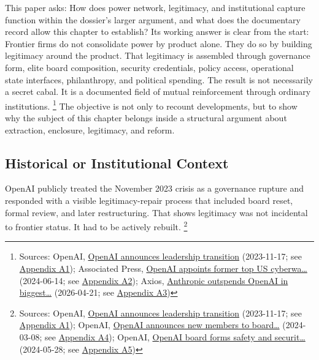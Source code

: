 \documentclass[
  american,
  11pt,
  letterpaper,
]{article}
\begin{document}
This paper asks: How does power network, legitimacy, and institutional
capture function within the dossier's larger argument, and what does the
documentary record allow this chapter to establish? Its working answer
is clear from the start: Frontier firms do not consolidate power by
product alone. They do so by building legitimacy around the product.
That legitimacy is assembled through governance form, elite board
composition, security credentials, policy access, operational state
interfaces, philanthropy, and political spending. The result is not
necessarily a secret cabal. It is a documented field of mutual
reinforcement through ordinary institutions. \footnote{Sources: OpenAI,
  \href{https://openai.com/index/openai-announces-leadership-transition/}{OpenAI
  announces leadership transition} (2023-11-17; see
  \hyperref[appendix-a1-openai-announces-leadership-transition]{Appendix
  A1}); Associated Press,
  \href{https://apnews.com/article/6ef612a3a0fcaef05480bbd1ebbd79b1}{OpenAI
  appoints former top US cyberwa\ldots{}} (2024-06-14; see
  \hyperref[appendix-a2-openai-appoints-former-top-us-cyberwarrior-paul-nakasone-to-its-board-of-directors]{Appendix
  A2}); Axios,
  \href{https://www.axios.com/2026/04/21/anthropic-outspends-openai-biggest-lobbying-quarter}{Anthropic
  outspends OpenAI in biggest\ldots{}} (2026-04-21; see
  \hyperref[appendix-a3-anthropic-outspends-openai-in-biggest-ever-lobbying-quarter]{Appendix
  A3})} The objective is not only to recount developments, but to show
why the subject of this chapter belongs inside a structural argument
about extraction, enclosure, legitimacy, and reform.

\subsection{Historical or Institutional
Context}\label{historical-or-institutional-context}

OpenAI publicly treated the November 2023 crisis as a governance rupture
and responded with a visible legitimacy-repair process that included
board reset, formal review, and later restructuring. That shows
legitimacy was not incidental to frontier status. It had to be actively
rebuilt. \footnote{Sources: OpenAI,
  \href{https://openai.com/index/openai-announces-leadership-transition/}{OpenAI
  announces leadership transition} (2023-11-17; see
  \hyperref[appendix-a1-openai-announces-leadership-transition]{Appendix
  A1}); OpenAI,
  \href{https://openai.com/index/openai-announces-new-members-to-board-of-directors/}{OpenAI
  announces new members to board\ldots{}} (2024-03-08; see
  \hyperref[appendix-a4-openai-announces-new-members-to-board-of-directors]{Appendix
  A4}); OpenAI,
  \href{https://openai.com/index/openai-board-forms-safety-and-security-committee/}{OpenAI
  board forms safety and securit\ldots{}} (2024-05-28; see
  \hyperref[appendix-a5-openai-board-forms-safety-and-security-committee]{Appendix
  A5})}
\end{document}
